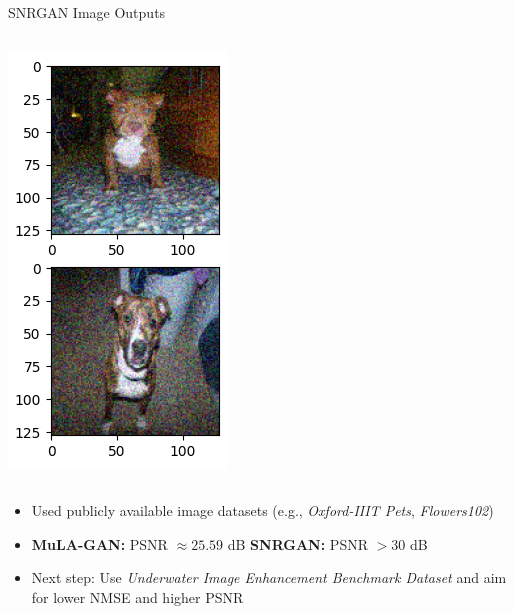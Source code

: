 \begin{frame}{SNRGAN Image Outputs}
\begin{columns}
\begin{column}{0.33\textwidth}
            \includegraphics[width=\linewidth,height=0.6\textheight,keepaspectratio]{images/img1.png}
        \end{column}
    \end{columns}
    
    \vspace{0.1em} 
    \begin{itemize}
        \item Used publicly available image datasets (e.g., \textit{Oxford-IIIT Pets}, \textit{Flowers102})
        \item \textbf{MuLA-GAN:} PSNR $\approx 25.59$ dB \textbf{SNRGAN:} PSNR $> 30$ dB
        \item Next step: Use \textit{Underwater Image Enhancement Benchmark Dataset} and aim for lower NMSE and higher PSNR
    \end{itemize}
\end{frame}

